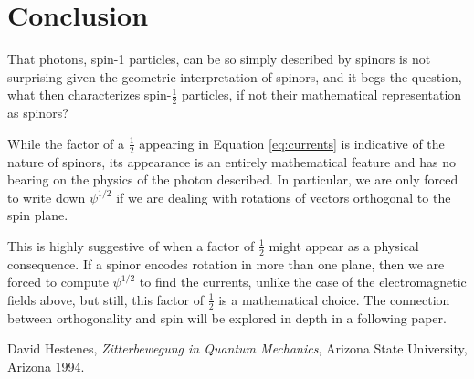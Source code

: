 \documentclass{birkjour}
\begin{document}
\section{Conclusion}

That photons, spin-1 particles, can be so simply described by spinors is not surprising given the geometric interpretation of spinors, and it begs the question, what then characterizes spin-$\frac{1}{2}$ particles, if not their mathematical representation as spinors?

While the factor of a $\frac{1}{2}$ appearing in Equation \ref{eq:currents} is indicative of the nature of spinors, its appearance is an entirely mathematical feature and has no bearing on the physics of the photon described. In particular, we are only forced to write down $\psi^{1/2}$ if we are dealing with rotations of vectors orthogonal to the spin plane.

This is highly suggestive of when a factor of $\frac{1}{2}$ might appear as a physical consequence. If a spinor encodes rotation in more than one plane, then we are forced to compute $\psi^{1/2}$ to find the currents, unlike the case of the electromagnetic fields above, but still, this factor of $\frac{1}{2}$ is a mathematical choice. The connection between orthogonality and spin will be explored in depth in a following paper.

\begin{thebibliography}{9}

  David Hestenes,
  \emph{Zitterbewegung in Quantum Mechanics},
   Arizona State University, Arizona
  1994.

\end{thebibliography}
\end{document}

